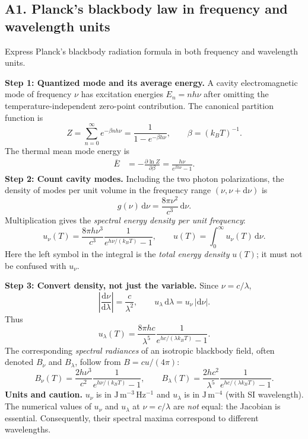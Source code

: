 \documentclass[11pt,a4paper]{article}
\newcommand{\dd}{\mathrm{d}}
\begin{document}
\subsection{A1. Planck's blackbody law in frequency and wavelength units}
\begin{questionbox}Express Planck's blackbody radiation formula in both frequency and wavelength units.\end{questionbox}
\textbf{Step 1: Quantized mode and its average energy.} A cavity electromagnetic mode of frequency $\nu$ has excitation energies $E_n=nh\nu$ after omitting the temperature-independent zero-point contribution. The canonical partition function is
\begin{equation}
Z=\sum_{n=0}^\infty e^{-\beta nh\nu}=\frac{1}{1-e^{-\beta h\nu}},\qquad \beta=(k_BT)^{-1}.
\end{equation}
The thermal mean mode energy is
\begin{align}
\overline E&=-\frac{\partial\ln Z}{\partial\beta}
=\frac{h\nu}{e^{\beta h\nu}-1}.
\end{align}
\textbf{Step 2: Count cavity modes.} Including the two photon polarizations, the density of modes per unit volume in the frequency range $(\nu,\nu+\dd\nu)$ is
\begin{equation}
g(\nu)\,\dd\nu=\frac{8\pi\nu^2}{c^3}\,\dd\nu.
\end{equation}
Multiplication gives the \emph{spectral energy density per unit frequency}:
\begin{equation}\label{eq:plancknu}
\boxed{u_\nu(T)=\frac{8\pi h\nu^3}{c^3}\frac{1}{e^{h\nu/(k_BT)}-1}},\qquad u(T)=\int_0^\infty u_\nu(T)\,\dd\nu.
\end{equation}
Here the left symbol in the integral is the \emph{total energy density} $u(T)$; it must not be confused with $u_\nu$.\par
\textbf{Step 3: Convert density, not just the variable.} Since $\nu=c/\lambda$,
\begin{equation}
\left|\frac{\dd\nu}{\dd\lambda}\right|=\frac{c}{\lambda^2},\qquad u_\lambda\,\dd\lambda=u_\nu\,|\dd\nu|.
\end{equation}
Thus
\begin{equation}\label{eq:plancklam}
\boxed{u_\lambda(T)=\frac{8\pi hc}{\lambda^5}\frac{1}{e^{hc/(\lambda k_BT)}-1}}.
\end{equation}
The corresponding \emph{spectral radiances} of an isotropic blackbody field, often denoted $B_\nu$ and $B_\lambda$, follow from $B=cu/(4\pi)$:
\begin{equation}
\boxed{B_\nu(T)=\frac{2h\nu^3}{c^2}\frac{1}{e^{h\nu/(k_BT)}-1}},\qquad
\boxed{B_\lambda(T)=\frac{2hc^2}{\lambda^5}\frac{1}{e^{hc/(\lambda k_BT)}-1}}.
\end{equation}
\textbf{Units and caution.} $u_\nu$ is in $\mathrm{J\,m^{-3}\,Hz^{-1}}$ and $u_\lambda$ is in $\mathrm{J\,m^{-4}}$ (with SI wavelength). The numerical values of $u_\nu$ and $u_\lambda$ at $\nu=c/\lambda$ are \emph{not} equal: the Jacobian is essential. Consequently, their spectral maxima correspond to different wavelengths.
\end{document}
